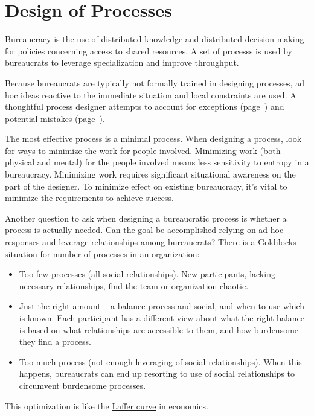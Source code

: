 \section{Design of Processes\label{sec:design-of-processes}}




Bureaucracy is the use of distributed knowledge and distributed decision making for policies concerning access to shared resources. A set of \glspl{process}
is used by \glspl{bureaucrat} to leverage specialization and improve throughput. 
    
Because bureaucrats are typically not formally trained in designing processes, ad hoc ideas reactive to the immediate situation and local constraints are used. A thoughtful process designer attempts to account for exceptions (page~\pageref{sec:exceptions-to-process}) and potential mistakes (page~\pageref{sec:process-mistakes}).

The most effective process is a minimal process.
When designing a process, look for ways to minimize the work for people involved. Minimizing work (both physical and mental) for the people involved means less sensitivity to entropy in a bureaucracy. Minimizing work requires significant situational awareness on the part of the designer. To minimize effect on existing bureaucracy, it's vital to minimize the requirements to achieve success.

Another question to ask when designing a bureaucratic process is whether a process is actually needed. Can the goal be accomplished relying on ad hoc responses and leverage relationships among bureaucrats?
There is a Goldilocks situation for number of processes in an organization:
\begin{itemize}
    \item Too few processes (all social relationships). New participants, lacking necessary relationships, find the team or organization chaotic. 
    \item Just the right amount -- a balance process and social, and when to use which is known. Each participant  has a different view about what the right balance is based on what relationships are accessible to them, and how burdensome they find a process. 
    \item Too much process (not enough leveraging of social relationships). When this happens, bureaucrats can end up resorting to use of social relationships to circumvent burdensome processes.
\end{itemize}
This optimization is like the \href{https://en.wikipedia.org/wiki/Laffer_curve}{Laffer curve} in economics.

